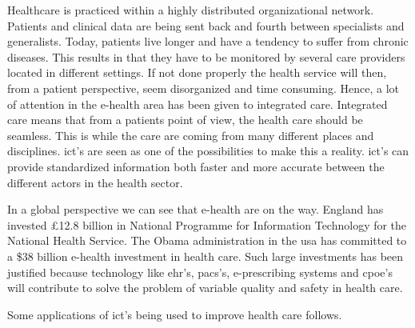 Healthcare is practiced within a highly distributed organizational network.
Patients and clinical data are being sent back and fourth between specialists and generalists.
Today, patients live longer and have a tendency to suffer from chronic diseases. 
This results in that they have to be monitored by several care providers located in different settings.
If not done properly the health service will then, from a patient perspective, seem disorganized and time consuming.
Hence, a lot of attention in the e-health area has been given to integrated care. 
Integrated care means that from a patients point of view, the health care should be seamless. 
This is while the care are coming from many different places and disciplines. 
\gls{ict}'s are seen as one of the possibilities to make this a reality. 
\gls{ict}'s can provide standardized information both faster and more accurate between the different actors in the health sector.

In a global perspective we can see that e-health are on the way.
England has invested £12.8 billion in National Programme for Information Technology for the National Health Service.
The Obama administration in the \gls{usa} has committed to a \$38 billion e-health investment in health care.
Such large investments has been justified because technology like \gls{ehr}'s, \gls{pacs}'s, e-prescribing systems and \gls{cpoe}'s will contribute to solve the problem of variable quality and safety in health care.

\cite{ictcare:winther}
\cite{ehealth:blaya}
\cite{ehealth:ashly}




Some applications of \gls{ict}'s being used to improve health care follows.

